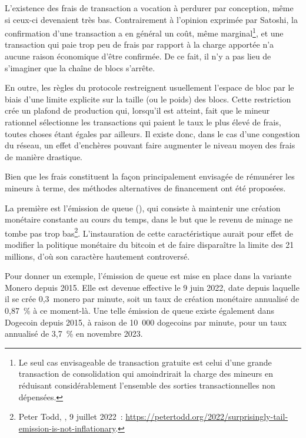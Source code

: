 L'existence des frais de transaction a vocation à perdurer par conception, même si ceux-ci devenaient très bas. Contrairement à l'opinion exprimée par Satoshi, la confirmation d'une transaction a en général un coût, même marginal\footnote{Le seul cas envisageable de transaction gratuite est celui d'une grande transaction de consolidation qui amoindrirait la charge des mineurs en réduisant considérablement l'ensemble des sorties transactionnelles non dépensées.}, et une transaction qui paie trop peu de frais par rapport à la charge apportée n'a aucune raison économique d'être confirmée. De ce fait, il n'y a pas lieu de s'imaginer que la chaîne de blocs s'arrête.

En outre, les règles du protocole restreignent usuellement l'espace de bloc par le biais d'une limite explicite sur la taille (ou le poids) des blocs. Cette restriction crée un plafond de production qui, lorsqu'il est atteint, fait que le mineur rationnel sélectionne les transactions qui paient le taux le plus élevé de frais, toutes choses étant égales par ailleurs. Il existe donc, dans le cas d'une congestion du réseau, un effet d'enchères pouvant faire augmenter le niveau moyen des frais de manière drastique.


Bien que les frais constituent la façon principalement envisagée de rémunérer les mineurs à terme, des méthodes alternatives de financement ont été proposées.

La première est l'émission de queue (), qui consiste à maintenir une création monétaire constante au cours du temps, dans le but que le revenu de minage ne tombe pas trop bas\footnote{Peter Todd, , 9 juillet 2022~: \url{https://petertodd.org/2022/surprisingly-tail-emission-is-not-inflationary}.}. L'instauration de cette caractéristique aurait pour effet de modifier la politique monétaire du bitcoin et de faire disparaître la limite des 21 millions, d'où son caractère hautement controversé.

Pour donner un exemple, l'émission de queue est mise en place dans la variante Monero depuis 2015. Elle est devenue effective le 9 juin 2022, date depuis laquelle il se crée 0,3~monero par minute, soit un taux de création monétaire annualisé de 0,87~\% à ce moment-là. Une telle émission de queue existe également dans Dogecoin depuis 2015, à raison de 10~000 dogecoins par minute, pour un taux annualisé de 3,7~\% en novembre 2023.

